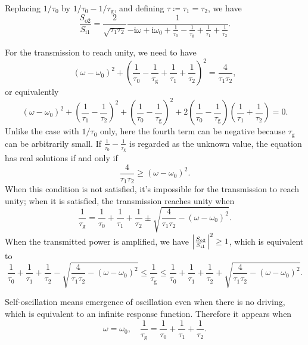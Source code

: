 \documentclass[hyperref, a4paper]{article}
\newcommand*{\ii}{\mathrm{i}}
\newcommand*{\Si}[1]{S_{\text{i#1}}}
\newcommand*{\So}[1]{S_{\text{o#1}}}
\newcommand*{\taug}{\tau_{\text{g}}}
\begin{document}
Replacing $1/\tau_0$ by $1 / \tau_0 - 1/\taug$, and defining $\tau \coloneqq \tau_1 = \tau_2$, we have 
\begin{equation}
    \frac{\So{2}}{\Si{1}} = \frac{2}{\sqrt{\tau_1 \tau_2}} 
    \frac{1}{- \ii \omega + \ii \omega_0 
    + \frac{1}{\tau_0} - \frac{1}{\taug} + \frac{1}{\tau_1} + \frac{1}{\tau_2}}.
\end{equation}

For the transmission to reach unity, we need to have
\[
    (\omega - \omega_0)^2 + \left( \frac{1}{\tau_0} - \frac{1}{\taug} + \frac{1}{\tau_1} + \frac{1}{\tau_2} \right)^2
    = \frac{4}{\tau_1 \tau_2},
\]
or equivalently 
\begin{equation}
    (\omega - \omega_0)^2 + \left( \frac{1}{\tau_1} - \frac{1}{\tau_2} \right)^2 
    + \left( \frac{1}{\tau_0} - \frac{1}{\taug} \right)^2 + 2 \left( \frac{1}{\tau_0} - \frac{1}{\taug} \right) \left( \frac{1}{\tau_1} + \frac{1}{\tau_2} \right) = 0.
\end{equation}
Unlike the case with $1 / \tau_0$ only, 
here the fourth term can be negative because $\taug$ can be arbitrarily small.
If $\frac{1}{\tau_0} - \frac{1}{\taug}$ is regarded as the unknown value,
the equation has real solutions if and only if 
\begin{equation}
    \frac{4}{\tau_1 \tau_2} \geq (\omega - \omega_0)^2. 
\end{equation}
When this condition is not satisfied, 
it's impossible for the transmission to reach unity; 
when it is satisfied, 
the transmission reaches unity when 
\begin{equation}
    \frac{1}{\taug} = \frac{1}{\tau_0} + \frac{1}{\tau_1} + \frac{1}{\tau_2} 
    \pm \sqrt{
        \frac{4}{\tau_1 \tau_2} - (\omega - \omega_0)^2
    }.
\end{equation}
When the transmitted power is amplified, we have $\abs{\frac{\So{2}}{\Si{1}}}^2 \geq 1$, 
which is equivalent to 
\begin{equation}
    \frac{1}{\tau_0} + \frac{1}{\tau_1} + \frac{1}{\tau_2} 
    - \sqrt{
        \frac{4}{\tau_1 \tau_2} - (\omega - \omega_0)^2
    } 
    \leq \frac{1}{\taug} \leq \frac{1}{\tau_0} + \frac{1}{\tau_1} + \frac{1}{\tau_2} 
    + \sqrt{
        \frac{4}{\tau_1 \tau_2} - (\omega - \omega_0)^2
    }.
\end{equation} 

Self-oscillation means emergence of oscillation even when there is no driving, 
which is equivalent to an infinite response function.
Therefore it appears when 
\begin{equation}
    \omega = \omega_0, \quad \frac{1}{\taug} = \frac{1}{\tau_0} + \frac{1}{\tau_1} + \frac{1}{\tau_2}.
\end{equation}
\end{document}
